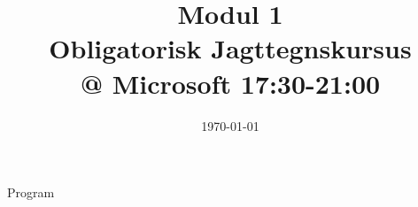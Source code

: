 \documentclass[11pt,aspectratio=169]{beamer}
\title{Modul 1 \\
Obligatorisk Jagttegnskursus \\ @ Microsoft 17:30-21:00}
\date{\today}
\begin{document}
\begin{frame}
  \titlepage
\end{frame}

\begin{frame}{Program}
  \tableofcontents
\end{frame}
























\end{document}
